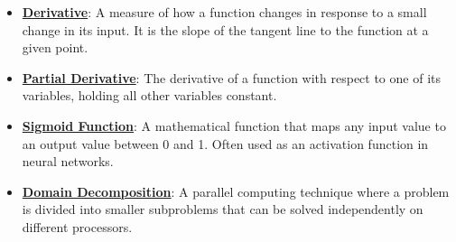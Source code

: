 \documentclass{article}%
\begin{document}
\begin{itemize}[leftmargin=*]
\item \href{https://purdue.brightspace.com/d2l/common/assets/pdfjs-d2l-dist/1.0.14-legacy/web/viewer.html?file=\%2Fcontent\%2Fenforced\%2F1095467-wl.202510.CS.24300.001\%2F04L1-Linear Algebra Primer.pdf\%3Fou\%3D1095467\&lang=en-us\&container=d2l-fileviewer-rendered-pdf\&fullscreen=d2l-fileviewer-rendered-pdf-dialog\&height=667#page=21}{\textbf{Derivative}}: A measure of how a function changes in response to a small change in its input. It is the slope of the tangent line to the function at a given point.%
\item \href{https://purdue.brightspace.com/d2l/common/assets/pdfjs-d2l-dist/1.0.14-legacy/web/viewer.html?file=\%2Fcontent\%2Fenforced\%2F1095467-wl.202510.CS.24300.001\%2F04L1-Linear Algebra Primer.pdf\%3Fou\%3D1095467\&lang=en-us\&container=d2l-fileviewer-rendered-pdf\&fullscreen=d2l-fileviewer-rendered-pdf-dialog\&height=667#page=19}{\textbf{Partial Derivative}}: The derivative of a function with respect to one of its variables, holding all other variables constant.%
\item \href{https://purdue.brightspace.com/d2l/common/assets/pdfjs-d2l-dist/1.0.14-legacy/web/viewer.html?file=\%2Fcontent\%2Fenforced\%2F1095467-wl.202510.CS.24300.001\%2F04L1-Linear Algebra Primer.pdf\%3Fou\%3D1095467\&lang=en-us\&container=d2l-fileviewer-rendered-pdf\&fullscreen=d2l-fileviewer-rendered-pdf-dialog\&height=667#page=21}{\textbf{Sigmoid Function}}: A mathematical function that maps any input value to an output value between 0 and 1. Often used as an activation function in neural networks.%
\item \href{https://purdue.brightspace.com/d2l/common/assets/pdfjs-d2l-dist/1.0.14-legacy/web/viewer.html?file=\%2Fcontent\%2Fenforced\%2F1095467-wl.202510.CS.24300.001\%2F04L1-Linear Algebra Primer.pdf\%3Fou\%3D1095467\&lang=en-us\&container=d2l-fileviewer-rendered-pdf\&fullscreen=d2l-fileviewer-rendered-pdf-dialog\&height=667#page=18}{\textbf{Domain Decomposition}}: A parallel computing technique where a problem is divided into smaller subproblems that can be solved independently on different processors.%
\end{itemize}%
\end{document}
